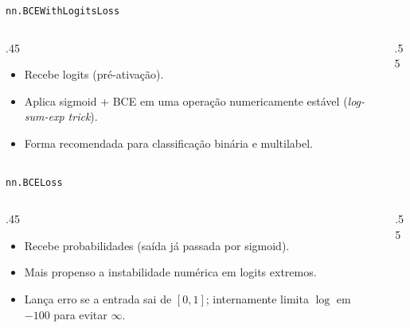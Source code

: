\documentclass[aspectratio=169,xcolor=dvipsnames]{beamer}
\begin{document}

  \begin{frame}{\texttt{nn.BCEWithLogitsLoss}}
    \begin{columns}
      \begin{column}{.45\linewidth}
        \begin{itemize}
          \item Recebe \alert{logits} (pré-ativação).
          \item Aplica sigmoid + BCE em uma operação numericamente estável (\textit{log-sum-exp trick}).
          \item Forma recomendada para classificação binária e multilabel.
        \end{itemize}
      \end{column}
      \begin{column}{.55\linewidth}
        \centering
        \resizebox*{\linewidth}{!}{
        }
      \end{column}
    \end{columns}
  \end{frame}

  \begin{frame}{\texttt{nn.BCELoss}}
    \begin{columns}
      \begin{column}{.45\linewidth}
        \begin{itemize}
          \item Recebe \alert{probabilidades} (saída já passada por sigmoid).
          \item Mais propenso a instabilidade numérica em logits extremos.
          \item Lança erro se a entrada sai de $[0,1]$; internamente limita $\log$ em $-100$ para evitar $\infty$.
        \end{itemize}
      \end{column}
      \begin{column}{.55\linewidth}
        \centering
        \resizebox*{\linewidth}{!}{
        }
      \end{column}
    \end{columns}
  \end{frame}
\end{document}
